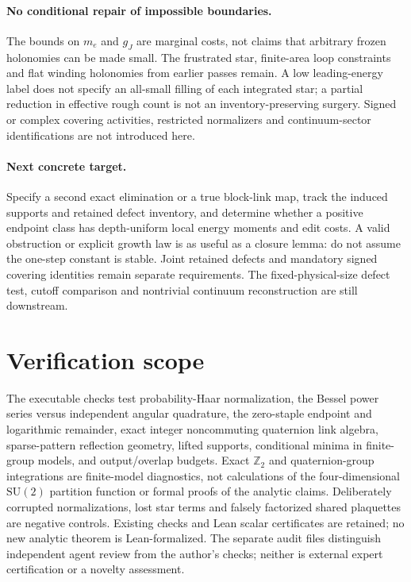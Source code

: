 \documentclass[11pt]{article}
\theoremstyle{definition}
\theoremstyle{remark}
\newcommand{\SU}{\mathrm{SU}(2)}
\begin{document}
\paragraph{No conditional repair of impossible boundaries.}
The bounds on $m_e$ and $g_J$ are marginal costs, not claims that arbitrary
frozen holonomies can be made small. The frustrated star, finite-area
loop constraints and flat winding holonomies from earlier passes remain.
A low leading-energy label does not specify an all-small filling of each
integrated star; a partial reduction in effective rough count is not an
inventory-preserving surgery. Signed or complex covering activities,
restricted normalizers and continuum-sector identifications are not
introduced here.

\paragraph{Next concrete target.}
Specify a second exact elimination or a true block-link map, track the
induced supports and retained defect inventory, and determine whether a
positive endpoint class has depth-uniform local energy moments and edit
costs. A valid obstruction or explicit growth law is as useful as a
closure lemma: do not assume the one-step constant is stable. Joint
retained defects and mandatory signed covering identities remain separate
requirements. The fixed-physical-size defect test, cutoff comparison and
nontrivial continuum reconstruction are still downstream.

\section{Verification scope}
The executable checks test probability-Haar normalization, the Bessel
power series versus independent angular quadrature, the zero-staple
endpoint and logarithmic remainder, exact integer noncommuting quaternion
link algebra, sparse-pattern reflection geometry, lifted supports,
conditional minima in finite-group models, and output/overlap budgets.
Exact $\mathbb Z_2$ and quaternion-group integrations are finite-model
diagnostics, not calculations of the four-dimensional $\SU$ partition
function or formal proofs of the analytic claims. Deliberately corrupted
normalizations, lost star terms and falsely factorized shared plaquettes
are negative controls. Existing checks and Lean scalar certificates are
retained; no new analytic theorem is Lean-formalized. The separate audit
files distinguish independent agent review from the author's checks;
neither is external expert certification or a novelty assessment.
\end{document}

